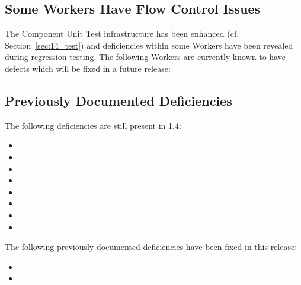 \subsection{Some  Workers Have Flow Control Issues} %
\label{bug:4486}
The Component Unit Test infrastructure has been enhanced (cf. Section~\ref{sec:14_test}) and deficiencies within some Workers have been revealed during regression testing. The following  Workers are currently known to have defects which will be fixed in a future release:
\begin{itemize}
\setlength\itemsep{0em} %
\begin{multicols}{3}
\item[] 
\item[] 
\item[] 
\item[] 
\item[] 
\end{multicols}
\end{itemize}

\subsection{Previously Documented Deficiencies}
The following deficiencies are still present in 1.4:
\begin{itemize}
\setlength\itemsep{0em} %
\item {}
\item {}
\item {}
\item {}
\item {}
\item {}
\item {}
\item {}
\end{itemize}

The following previously-documented deficiencies have been fixed in this release:
\begin{itemize}
\setlength\itemsep{0em} %
\item {}
\item {}
\end{itemize}


\newpage
{}
\def\ocpiversion{v1.3.1}  %
\label{sec:appendices}
